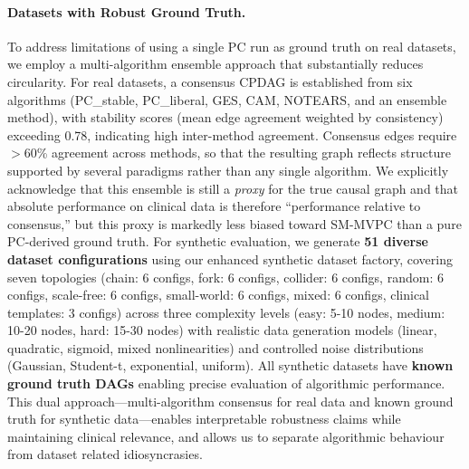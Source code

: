 \documentclass[runningheads]{llncs}
\newcommand{\Matin}{\textcolor{magenta}}
\begin{document}
\paragraph{Datasets with Robust Ground Truth.}
To address limitations of using a single PC run as ground truth on real datasets, we employ a multi-algorithm ensemble approach that substantially reduces circularity. For real datasets, a consensus CPDAG is established from six algorithms (PC\_stable, PC\_liberal, GES, CAM, NOTEARS, and an ensemble method), with stability scores (mean edge agreement weighted by consistency) exceeding 
0.78, indicating high inter-method agreement. Consensus edges require $>$60\% agreement across methods, so that the resulting graph reflects structure supported by several paradigms rather than any single algorithm. We explicitly acknowledge that this ensemble is still a \emph{proxy} for the true causal graph and that absolute performance on clinical data is therefore “performance relative to consensus,” but this proxy is markedly less biased toward SM-MVPC than a pure PC-derived ground truth. For synthetic evaluation, we generate \textbf{51 diverse dataset configurations} using our enhanced synthetic dataset factory, covering seven topologies (chain: 6 configs, fork: 6 configs, collider: 6 configs, random: 6 configs, scale-free: 6 configs, small-world: 6 configs, mixed: 6 configs, clinical templates: 3 configs) across three complexity levels (easy: 5-10 nodes, medium: 10-20 nodes, hard: 15-30 nodes) with realistic data generation models (linear, quadratic, sigmoid, mixed nonlinearities) and controlled noise distributions (Gaussian, Student-t, exponential, uniform). All synthetic datasets have \textbf{known ground truth DAGs} enabling precise evaluation of algorithmic performance. This dual approach—multi-algorithm consensus for real data and known ground truth for synthetic data—enables interpretable robustness claims while maintaining clinical relevance, and allows us to separate algorithmic behaviour from dataset related idiosyncrasies.
\end{document}
